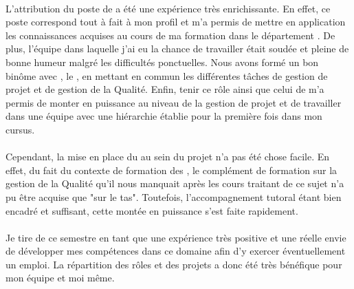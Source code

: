 \documentclass[asi]{picInsa}
\begin{document}
\paragraph*{} L'attribution du poste de \RQ{} a été une expérience très enrichissante. En effet, ce poste correspond tout à fait à mon profil et m'a permis de mettre en application les connaissances acquises au cours de ma formation dans le département \ASI{}. De plus, l'équipe dans laquelle j'ai eu la chance de travailler était soudée et pleine de bonne humeur malgré les difficultés ponctuelles. Nous avons formé un bon binôme avec \Sergi{}, le \CP{}, en mettant en commun les différentes tâches de gestion de projet et de gestion de la Qualité. Enfin, tenir ce rôle ainsi que celui de \CPA{} m'a permis de monter en puissance au niveau de la gestion de projet et de travailler dans une équipe avec une hiérarchie établie pour la première fois dans mon cursus.

\paragraph*{} Cependant, la mise en place du \SMQ{} au sein du projet n'a pas été chose facile. En effet, du fait du contexte de formation des \PIC{}, le complément de formation sur la gestion de la Qualité qu'il nous manquait après les cours traitant de ce sujet n'a pu être acquise que "sur le tas". Toutefois, l'accompagnement tutoral étant bien encadré et suffisant, cette montée en puissance s'est faite rapidement.

\paragraph*{} Je tire de ce semestre en tant que \RQ{} une expérience très positive et une réelle envie de développer mes compétences dans ce domaine afin d'y exercer éventuellement un emploi. La répartition des rôles et des projets a donc été très bénéfique pour mon équipe et moi même.

\pageQuatriemeCouverture
\end{document}

